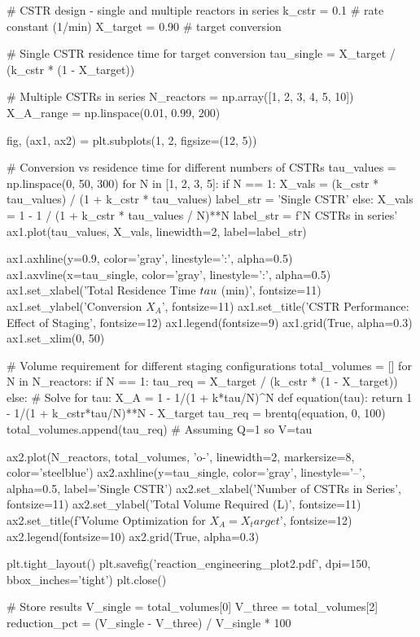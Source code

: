 \documentclass[11pt,a4paper]{article}
\begin{document}
\begin{pycode}
# CSTR design - single and multiple reactors in series
k_cstr = 0.1  # rate constant (1/min)
X_target = 0.90  # target conversion

# Single CSTR residence time for target conversion
tau_single = X_target / (k_cstr * (1 - X_target))

# Multiple CSTRs in series
N_reactors = np.array([1, 2, 3, 4, 5, 10])
X_A_range = np.linspace(0.01, 0.99, 200)

fig, (ax1, ax2) = plt.subplots(1, 2, figsize=(12, 5))

# Conversion vs residence time for different numbers of CSTRs
tau_values = np.linspace(0, 50, 300)
for N in [1, 2, 3, 5]:
    if N == 1:
        X_vals = (k_cstr * tau_values) / (1 + k_cstr * tau_values)
        label_str = 'Single CSTR'
    else:
        X_vals = 1 - 1 / (1 + k_cstr * tau_values / N)**N
        label_str = f'{N} CSTRs in series'
    ax1.plot(tau_values, X_vals, linewidth=2, label=label_str)

ax1.axhline(y=0.9, color='gray', linestyle=':', alpha=0.5)
ax1.axvline(x=tau_single, color='gray', linestyle=':', alpha=0.5)
ax1.set_xlabel('Total Residence Time $\\tau$ (min)', fontsize=11)
ax1.set_ylabel('Conversion $X_A$', fontsize=11)
ax1.set_title('CSTR Performance: Effect of Staging', fontsize=12)
ax1.legend(fontsize=9)
ax1.grid(True, alpha=0.3)
ax1.set_xlim(0, 50)

# Volume requirement for different staging configurations
total_volumes = []
for N in N_reactors:
    if N == 1:
        tau_req = X_target / (k_cstr * (1 - X_target))
    else:
        # Solve for tau: X_A = 1 - 1/(1 + k*tau/N)^N
        def equation(tau):
            return 1 - 1/(1 + k_cstr*tau/N)**N - X_target
        tau_req = brentq(equation, 0, 100)
    total_volumes.append(tau_req)  # Assuming Q=1 so V=tau

ax2.plot(N_reactors, total_volumes, 'o-', linewidth=2, markersize=8, color='steelblue')
ax2.axhline(y=tau_single, color='gray', linestyle='--', alpha=0.5, label='Single CSTR')
ax2.set_xlabel('Number of CSTRs in Series', fontsize=11)
ax2.set_ylabel('Total Volume Required (L)', fontsize=11)
ax2.set_title(f'Volume Optimization for $X_A = {X_target}$', fontsize=12)
ax2.legend(fontsize=10)
ax2.grid(True, alpha=0.3)

plt.tight_layout()
plt.savefig('reaction_engineering_plot2.pdf', dpi=150, bbox_inches='tight')
plt.close()

# Store results
V_single = total_volumes[0]
V_three = total_volumes[2]
reduction_pct = (V_single - V_three) / V_single * 100
\end{pycode}
\end{document}
